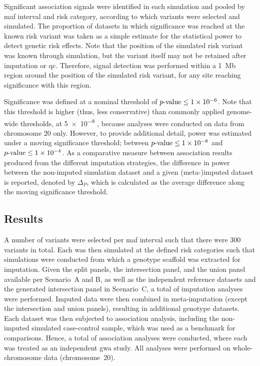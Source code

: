 Significant association signals were identified in each simulation and pooled by \gls{maf} interval and risk category, according to which variants were selected and simulated.
The proportion of datasets in which significance was reached at the known risk variant was taken as a simple estimate for the statistical power to detect genetic risk effects.
Note that the position of the simulated risk variant was known through simulation, but the variant itself may not be retained after imputation or \gls{qc}.
Therefore, signal detection was performed within a 1~\gls{Mb} region around the position of the simulated risk variant, for any site reaching significance with this region.

Significance was defined at a nominal threshold of ${\mbox{$p$-value}\leq1\times10^{-6}}$.
Note that this threshold is higher (thus, less conservative) than commonly applied genome-wide thresholds, \eg at \num{5e-8} \citep[\eg, see][]{Risch:1996ub}, because analyses were conducted on data from chromosome 20 only.
However, to provide additional detail, power was estimated under a moving significance threshold; between ${\mbox{$p$-value}\leq1\times10^{-8}}$ and ${\mbox{$p$-value}\leq1\times10^{-4}}$.
As a comparative measure between association results produced from the different imputation strategies,
the difference in power between the non-imputed simulation dataset and a given (meta-)imputed dataset is reported, denoted by ${\Delta_P}$, which is calculated as the average difference along the moving significance threshold.


%
\subsection{Results}
\label{sec:meta_power_results}
%

A number of  variants were selected per \gls{maf} interval such that there were 300 variants in total.
Each was then simulated at the  defined risk categories such that  simulations were conducted
from which a genotype scaffold was extracted for imputation.
Given the  split panels, the intersection panel, and the union panel available per Scenario~A and B, as well as the  independent reference datasets and the generated intersection panel in Scenario~C, a total of  imputation analyses were performed.
Imputed data were then combined in meta-imputation (except the intersection and union panels), resulting in  additional genotype datasets.
Each dataset was then subjected to association analysis, including the non-imputed simulated case-control sample, which was used as a benchmark for comparisons.
Hence, a total of  association analyses were conducted, where each was treated as an independent \gls{gwa} study.
All analyses were performed on whole-chromosome data (chromosome~20).


